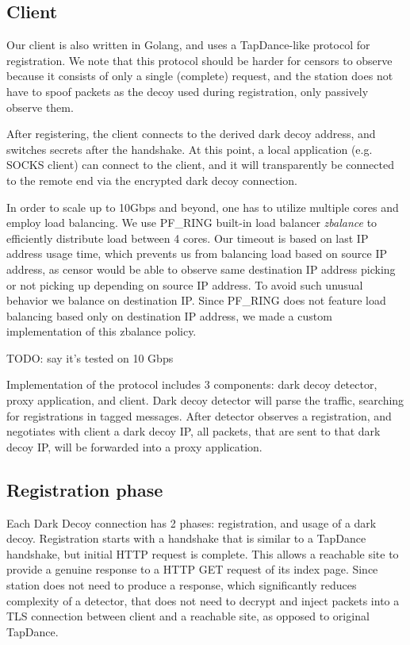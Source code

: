 \documentclass[letterpaper,twocolumn,10pt]{article}
\begin{document}
\subsection{Client}

Our client is also written in Golang, and uses a TapDance-like protocol for
registration. We note that this protocol should be harder for censors to observe
because it consists of only a single (complete) request, and the station does
not have to spoof packets as the decoy used during registration, only passively
observe them.

After registering, the client connects to the derived dark decoy address, and
switches secrets after the handshake. At this point, a local application (e.g.
SOCKS client) can connect to the client, and it will transparently be connected to
the remote end via the encrypted dark decoy connection.

In order to scale up to 10Gbps and beyond,
one has to utilize multiple cores and employ load balancing.
We use PF\_RING built-in load balancer \emph{zbalance} to efficiently
distribute load between 4 cores.
Our timeout is based on last IP address usage time, which prevents us from
balancing load based on source IP address,
as censor would be able to observe
same destination IP address picking or not picking up
depending on source IP address.
To avoid such unusual behavior we balance on destination IP.
Since PF\_RING does not feature load balancing based only on destination
IP address, we made a custom implementation of this zbalance policy.

TODO: say it's tested on 10 Gbps

Implementation of the protocol includes 3 components:
dark decoy detector, proxy application, and client.
Dark decoy detector will parse the traffic, searching for registrations in
tagged messages. After detector observes a registration, and negotiates with client
a dark decoy IP,
all packets, that are sent to that dark decoy IP,
will be forwarded into a proxy application.

\subsection{Registration phase}

Each Dark Decoy connection has 2 phases: registration, and usage of a dark decoy.
Registration starts with a handshake that is similar to a TapDance handshake,
but initial HTTP request is complete.
This allows a reachable site to provide a genuine response
to a HTTP GET request of its index page.
Since station does not need to produce a response,
which significantly reduces complexity of a detector,
that does not need to decrypt and inject packets into a TLS connection between
client and a reachable site, as opposed to original TapDance.
\end{document}
